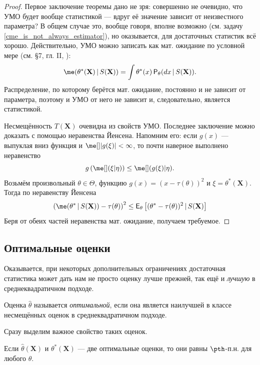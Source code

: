 \begin{proof}
    Первое заключение теоремы дано не зря: совершенно не очевидно, что УМО будет вообще статистикой --- вдруг её значение зависит от неизвестного параметра? В общем случае это, вообще говоря, вполне возможно (см. задачу \ref{cme_is_not_always_estimator}), но оказывается, для достаточных статистик всё хорошо. Действительно, УМО можно записать как мат. ожидание по условной мере (см. \S7, гл. II, \cite{shiryaev}):
    \[
    \me(\theta^*(\mathbf X)\,|\,S(\mathbf X)) = \int \theta^*(x) \,\mathsf{P}_{\theta}(dx\,|\,S(\mathbf X)).
    \]
    Распределение, по которому берётся мат. ожидание, постоянно и не зависит от параметра, поэтому и УМО от него не зависит и, следовательно, является статистикой.

    Несмещённость $T(\mathbf X)$ очевидна из свойств УМО. Последнее заключение можно доказать с помощью неравенства Йенсена. Напомним его: если $g(x)$ --- выпуклая вниз функция и $\me[]|g(\xi)| < \infty$, то почти наверное выполнено неравенство
    \[
    g\left(\me[](\xi | \eta)\right) \le \me[](g(\xi) | \eta).
    \]
    Возьмём произвольный $\theta \in \Theta$, функцию $g(x) = (x - \tau(\theta))^2$ и $\xi = \theta^*(\mathbf X)$. Тогда по неравенству Йенсена
    \[
    \left(\me(\theta^*\,|\,S(\mathbf X)) - \tau(\theta)\right)^2 \le \mathsf{E}_{\theta}\left[(\theta^* - \tau(\theta))^2\,|\,S(\mathbf X)\right]
    \]
    Беря от обеих частей неравенства мат. ожидание, получаем требуемое.
\end{proof}

\subsection{Оптимальные оценки}

Оказывается, при некоторых дополнительных ограничениях достаточная статистика может дать нам не просто оценку лучше прежней, так ещё и \textit{лучшую} в среднеквадратичном подходе.

\begin{definition}
    Оценка $\widehat{\theta}$ называется \textit{оптимальной}, если она является наилучшей в классе несмещённых оценок в среднеквадратичном подходе.
\end{definition}

Сразу выделим важное свойство таких оценок.

\begin{proposition}
    Если $\widehat{\theta}(\mathbf X)$ и $\theta^*(\mathbf X)$ --- две оптимальные оценки, то они равны $\pth$-п.н. для любого $\theta$.
\end{proposition}

